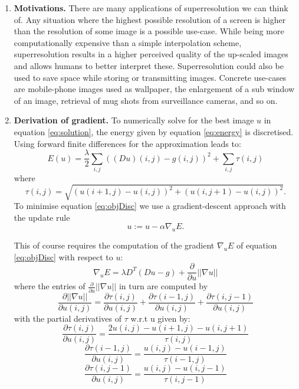 \documentclass{paper}
\begin{document}
\begin{enumerate}
\item \textbf{Motivations.} There are many applications of superresolution we can think of. Any situation where the highest possible resolution of a screen is higher than the resolution of some image is a possible use-case. While being more computationally expensive than a simple interpolation scheme, superresolution results in a higher perceived quality of the up-scaled images and allows humans to better interpret these. Superresolution could also be used to save space while storing or transmitting images. Concrete use-cases are mobile-phone images used as wallpaper, the enlargement of a sub window of an image, retrieval of mug shots from surveillance cameras, and so on.

\item \textbf{Derivation of gradient.} To numerically solve for the best image $u$ in equation \ref{eq:solution}, the energy given by equation \ref{eq:energy} is discretised. Using forward finite differences for the approximation leads to:
\begin{equation}\label{eq:objDisc}
E(u)=\frac{\lambda}{2}\sum_{i,j}((Du)(i,j)-g(i,j))^2+\sum_{i,j}\tau (i,j)
\end{equation}
where 
\begin{equation}\label{eq:tau}
\tau (i,j)=\sqrt{(u(i+1,j)-u(i,j))^2+(u(i,j+1)-u(i,j))^2}.
\end{equation}
To minimise equation \ref{eq:objDisc} we use a gradient-descent approach with the update rule 
\begin{equation}\label{eq:GD}
u:=u-\alpha\nabla_{u}E. 
\end{equation}

This of course requires the computation of the gradient $\nabla_{u}E$ of equation \ref{eq:objDisc} with respect to $u$:
\begin{equation}\label{eq:gradientE}
\nabla_{u}E=\lambda D^T(Du-g)+\frac{\partial}{\partial u}||\nabla u||
\end{equation}
where the entries of $\frac{\partial}{\partial u}||\nabla u||$ in turn are computed by
\begin{equation}\label{eq:gradTau}
\frac{\partial ||\nabla u||}{\partial u(i,j)}=\frac{\partial \tau (i,j)}{\partial u(i,j)}+\frac{\partial \tau (i-1,j)}{\partial u(i,j)}+\frac{\partial \tau (i,j-1)}{\partial u(i,j)}
\end{equation}
with the partial derivatives of $\tau$ w.r.t u given by:
\begin{equation}\label{eq:gradTau1}
\frac{\partial \tau (i,j)}{\partial u(i,j)}=\frac{2u(i,j)-u(i+1,j)-u(i,j+1)}{\tau(i,j)}
\end{equation}
\begin{equation}\label{eq:gradTau2}
\frac{\partial \tau (i-1,j)}{\partial u(i,j)}=\frac{u(i,j)-u(i-1,j)}{\tau(i-1,j)}
\end{equation}
\begin{equation}\label{eq:gradTau3}
\frac{\partial \tau (i,j-1)}{\partial u(i,j)}=\frac{u(i,j)-u(i,j-1)}{\tau(i,j-1)}
\end{equation}




\end{enumerate}
\end{document}
